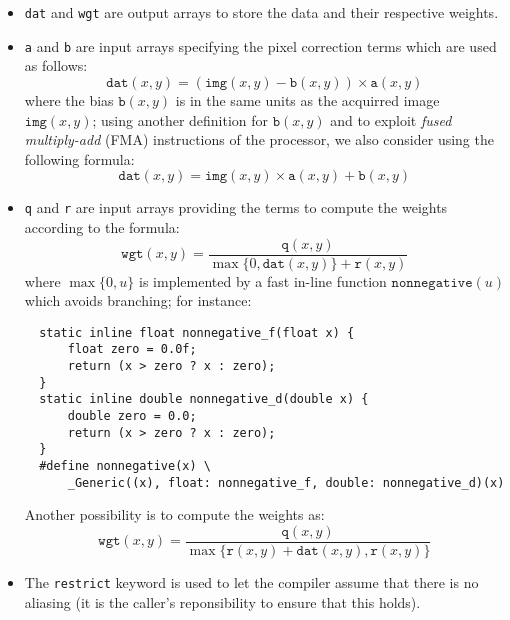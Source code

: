 \documentclass[10pt]{article}
\begin{document}
\begin{itemize}
\item \verb+dat+ and \verb+wgt+ are output arrays to store the data
  and their respective weights.

\item \verb+a+ and \verb+b+ are input arrays specifying the pixel
  correction terms which are used as follows:
  \begin{equation}
    \mathtt{dat}(x,y) = (\mathtt{img}(x,y) - \mathtt{b}(x,y))
    \times\mathtt{a}(x,y)
    \label{eq:affine-correction}
  \end{equation}
  where the bias $\mathtt{b}(x,y)$ is in the same units as the
  acquirred image $\mathtt{img}(x,y)$; using another definition for
  $\mathtt{b}(x,y)$ and to exploit \emph{fused multiply-add} (FMA)
  instructions of the processor, we also consider using the following
  formula:
  \begin{equation}
    \mathtt{dat}(x,y) = \mathtt{img}(x,y)\times\mathtt{a}(x,y)
    + \mathtt{b}(x,y)
    \label{eq:affine-correction-fma}
  \end{equation}

\item \verb+q+ and \verb+r+ are input arrays providing the terms to
  compute the weights according to the formula:
  \begin{equation}
    \mathtt{wgt}(x,y) = \frac{\mathtt{q}(x,y)}{
      \max\{0, \mathtt{dat}(x,y)\} + \mathtt{r}(x,y)}
    \label{eq:weights}
  \end{equation}
  where $\max\{0,u\}$ is implemented by a fast in-line function
  $\mathtt{nonnegative}(u)$ which avoids branching; for instance:
  \begin{verbatim}
  static inline float nonnegative_f(float x) {
      float zero = 0.0f;
      return (x > zero ? x : zero);
  }
  static inline double nonnegative_d(double x) {
      double zero = 0.0;
      return (x > zero ? x : zero);
  }
  #define nonnegative(x) \
      _Generic((x), float: nonnegative_f, double: nonnegative_d)(x)
  \end{verbatim}
  Another possibility is to compute the weights as:
  \begin{equation}
    \mathtt{wgt}(x,y) = \frac{\mathtt{q}(x,y)}{
    \max\{\mathtt{r}(x,y) + \mathtt{dat}(x,y), \mathtt{r}(x,y)\}}
    \label{eq:weights-2}
  \end{equation}

\item The \verb+restrict+ keyword is used to let the compiler assume
  that there is no aliasing (it is the caller's reponsibility to
  ensure that this holds).
\end{itemize}
\end{document}
